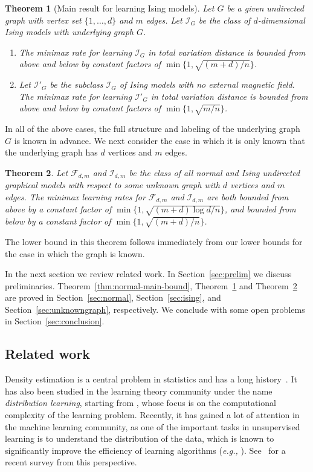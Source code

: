 \documentclass[letterpaper]{amsart}
\makeatletter
\newcommand{\sI}{\mathcal{I}}
\newcommand{\sF}{\mathcal{F}}
\newcommand*{\eg}{\emph{e.g.,}\@\xspace}
\newcommand{\secref}[1]{\mbox{Section~\ref{sec:#1}}}
\newtheorem{thm}{Theorem}{\bfseries}{\itshape}
\newcommand{\thmlabel}[1]{\label{thm:#1}}
\newcommand{\thmref}[1]{Theorem~\ref{thm:#1}}
\numberwithin{thm}{section}
\theoremstyle{definition}
\theoremstyle{plain}
\makeatother
\begin{document}
\begin{thm}[Main result for learning Ising models]\thmlabel{ising-main-bound}
  Let $G$ be a given undirected graph with vertex set
  $\{1, \dots, d\}$ and $m$ edges. Let $\sI_G$ be the class of
  $d$-dimensional Ising models with underlying graph $G$.
  \begin{enumerate}[label=(\roman*)]
  \item \label{ising-1} The minimax rate for learning $\sI_{G}$ in
    total variation distance is bounded from above and below by
    constant factors of $\min\{1, \sqrt{(m + d)/n}\}$.
  \item \label{ising-2} Let $\sI'_{G}$ be the subclass $\sI_G$ of
    Ising models with no external magnetic field. The minimax rate for
    learning $\sI'_{G}$ in total variation distance is bounded from
    above and below by constant factors of $\min\{1, \sqrt{m/n}\}$.
  \end{enumerate}
\end{thm}

In all of the above cases, the full structure and labeling of the
underlying graph $G$ is known in advance. We next consider the case in
which it is only known that the underlying graph has $d$ vertices and
$m$ edges.
\begin{thm}\thmlabel{unknowngraph}
  Let $\sF_{d,m}$ and $\sI_{d,m}$ be the class of all normal and Ising
  undirected graphical models with respect to some unknown graph with
  $d$ vertices and $m$ edges. The minimax learning rates for
  $\sF_{d, m}$ and $\sI_{d, m}$ are both bounded from above by a
  constant factor of $\min\{1, \sqrt{(m + d) \log d/n}\}$, and bounded
  from below by a constant factor of $\min\{1, \sqrt{(m + d)/n}\}$.
\end{thm}
The lower bound in this theorem follows immediately from our lower
bounds for the case in which the graph is known.

In the next section we review related work.  In \secref{prelim} we
discuss preliminaries.  \thmref{normal-main-bound},
\thmref{ising-main-bound} and \thmref{unknowngraph} are proved in
\secref{normal}, \secref{ising}, and Section~\ref{sec:unknowngraph},
respectively.  We conclude with some open problems in
\secref{conclusion}.
 
\subsection{Related work}\label{sec:related}

Density estimation is a central problem in statistics and has a long
history~\cite{devroye-course,devroye-gyorfi,ibragimov,tsybakov}.  It
has also been studied in the learning theory community under the name
\emph{distribution learning}, starting from \cite{Kearns}, whose focus
is on the computational complexity of the learning problem. Recently,
it has gained a lot of attention in the machine learning community, as
one of the important tasks in unsupervised learning is to understand
the distribution of the data, which is known to significantly improve
the efficiency of learning algorithms (\eg
\cite[page~100]{deeplearningbook}).  See~\cite{Diakonikolas2016} for a
recent survey from this perspective.
\end{document}
